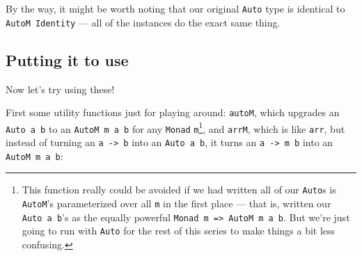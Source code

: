 \documentclass[]{article}
\newenvironment{Shaded}{}{}
\newcommand{\CommentTok}[1]{\textcolor[rgb]{0.38,0.63,0.69}{\textit{#1}}}
\newcommand{\DataTypeTok}[1]{\textcolor[rgb]{0.56,0.13,0.00}{#1}}
\newcommand{\FunctionTok}[1]{\textcolor[rgb]{0.02,0.16,0.49}{#1}}
\newcommand{\KeywordTok}[1]{\textcolor[rgb]{0.00,0.44,0.13}{\textbf{#1}}}
\newcommand{\NormalTok}[1]{#1}
\newcommand{\OperatorTok}[1]{\textcolor[rgb]{0.40,0.40,0.40}{#1}}
\newcommand{\OtherTok}[1]{\textcolor[rgb]{0.00,0.44,0.13}{#1}}
\begin{document}
By the way, it might be worth noting that our original \texttt{Auto} type is
identical to \texttt{AutoM\ Identity} --- all of the instances do the exact same
thing.

\subsection{Putting it to use}\label{putting-it-to-use}

Now let's try using these!

First some utility functions just for playing around: \texttt{autoM}, which
upgrades an \texttt{Auto\ a\ b} to an \texttt{AutoM\ m\ a\ b} for any
\texttt{Monad} \texttt{m}\footnote{This function really could be avoided if we
  had written all of our \texttt{Auto}s is \texttt{AutoM}'s parameterized over
  all \texttt{m} in the first place --- that is, written our
  \texttt{Auto\ a\ b}'s as the equally powerful
  \texttt{Monad\ m\ =\textgreater{}\ AutoM\ m\ a\ b}. But we're just going to
  run with \texttt{Auto} for the rest of this series to make things a bit less
  confusing.}, and \texttt{arrM}, which is like \texttt{arr}, but instead of
turning an \texttt{a\ -\textgreater{}\ b} into an \texttt{Auto\ a\ b}, it turns
an \texttt{a\ -\textgreater{}\ m\ b} into an \texttt{AutoM\ m\ a\ b}:

\begin{Shaded}
\end{Shaded}
\end{document}
